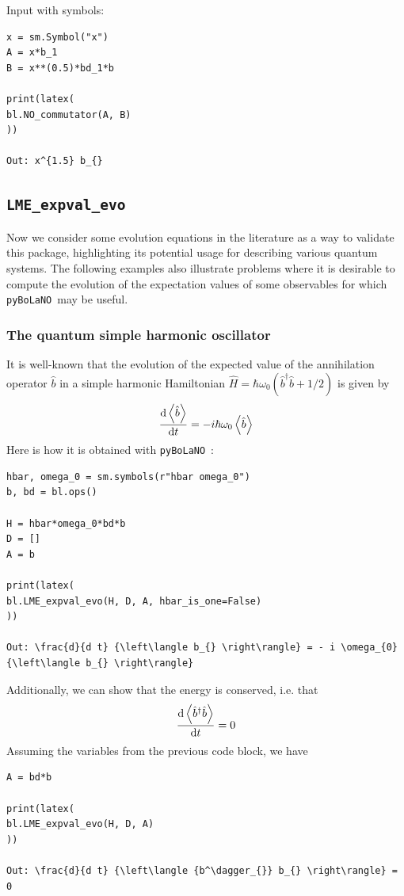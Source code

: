 \documentclass[onecolumn, 12pt, sort&compress]{elsarticle}
\newcommand{\inlinecode}[1]{\texttt{#1}}
\newcommand{\expval}[1]{\left\langle{#1}\right\rangle}
\newcommand{\bop}{\hat{b}}
\newcommand{\bdag}{\bop^\dagger}
\newcommand{\pybolano}{\texttt{pyBoLaNO}~}
\begin{document}
\noindent Input with symbols:
\begin{verbatim}
x = sm.Symbol("x")
A = x*b_1 
B = x**(0.5)*bd_1*b

print(latex(
bl.NO_commutator(A, B)
))

Out: x^{1.5} b_{}
\end{verbatim}


\subsection{\inlinecode{LME_expval_evo}}

Now we consider some evolution equations in the literature as a way to validate this package, highlighting its potential usage for describing various quantum systems.  The following examples also illustrate problems where it is desirable to compute the evolution of the expectation values of some observables for which \pybolano may be useful. 

\subsubsection{The quantum simple harmonic oscillator}

It is well-known that the evolution of the expected value of the annihilation operator $\bop$ in a simple harmonic Hamiltonian $\hat{H} = \hbar\omega_0\left(\bdag\bop+1/2\right)$ is given by
\begin{equation}
    \odv{\expval{\bop}}{t} = -i\hbar\omega_0\expval{\bop}
\end{equation}
Here is how it is obtained with \pybolano:
\begin{verbatim}
hbar, omega_0 = sm.symbols(r"hbar omega_0")
b, bd = bl.ops()

H = hbar*omega_0*bd*b
D = []
A = b

print(latex(
bl.LME_expval_evo(H, D, A, hbar_is_one=False)
))

Out: \frac{d}{d t} {\left\langle b_{} \right\rangle} = - i \omega_{0} {\left\langle b_{} \right\rangle}
\end{verbatim}
Additionally, we can show that the energy is conserved, i.e. that
\begin{equation}
    \odv{\expval{\bdag\bop}}{t} = 0
\end{equation}
Assuming the variables from the previous code block, we have
\begin{verbatim}
A = bd*b

print(latex(
bl.LME_expval_evo(H, D, A)
))

Out: \frac{d}{d t} {\left\langle {b^\dagger_{}} b_{} \right\rangle} = 0
\end{verbatim}
\end{document}
